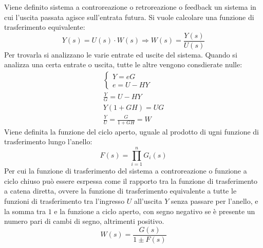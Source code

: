 \documentclass{article}
\numberwithin{equation}{subsection}
\begin{document}
Viene definito sistema a controreazione o retroreazione o feedback un sistema in cui l'uscita passata agisce sull'entrata futura. Si vuole calcolare 
una funzione di trasferimento equivalente:
\begin{equation}
    Y(s)=U(s)\cdot W(s)\Rightarrow W(s)=\displaystyle\frac{Y(s)}{U(s)}
\end{equation}    
Per trovarla si analizzano le varie entrate ed uscite del sistema. Quando si analizza una certa 
entrate o uscita, tutte le altre vengono consdierate nulle:
\begin{gather}
    \begin{cases}
        Y=eG\\
        e=U-HY
    \end{cases}\\
    \displaystyle\frac{Y}{G}=U-HY\\
    Y(1+GH)=UG\\
    \displaystyle\frac{Y}{U}=\frac{G}{1+GH}=W
\end{gather}
Viene definita la funzione del ciclo aperto, uguale al prodotto di ugni funzione di trasferimento lungo l'anello:
\begin{equation}
    F(s)=\prod_{i=1}^nG_i(s)
\end{equation}
Per cui la funzione di trasferimento del sistema a controreazione o funzione a ciclo chiuso può essere esrpessa come il rapporto tra la funzione di 
trasferimento a catena diretta, 
ovvere la funzione di trasferimento equivalente a tutte le funzioni di trasferimento tra l'ingresso $U$ all'uscita $Y$ senza passare per l'anello, e la 
somma tra $1$ e la funzione a ciclo aperto, con segno negativo se è presente un numero pari di cambi di segno, altrimenti positivo. 
\begin{equation}
    W(s)=\displaystyle\frac{G(s)}{1\pm F(s)}
\end{equation}

\begin{center}\end{center}
\end{document}
